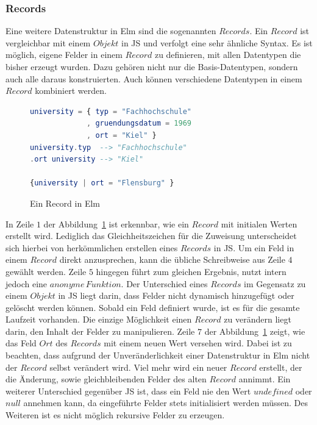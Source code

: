 \subsubsection{Records}
\label{sec:Records}
Eine weitere Datenstruktur in Elm sind die sogenannten $Records$. Ein $Record$ ist vergleichbar mit einem $Objekt$ in \ac{JS} und verfolgt eine sehr ähnliche Syntax. Es ist möglich, eigene Felder in einem $Record$ zu definieren, mit allen Datentypen die bisher erzeugt wurden. Dazu gehören nicht nur die Basis-Datentypen, sondern auch alle daraus konstruierten. Auch können verschiedene Datentypen in einem $Record$ kombiniert werden.
\begin{figure}[h]
\begin{lstlisting}[language=Elm]
university = { typ = "Fachhochschule"
             , gruendungsdatum = 1969
             , ort = "Kiel" }
university.typ  --> "Fachhochschule"
.ort university --> "Kiel"

{university | ort = "Flensburg" }
\end{lstlisting}
\caption{Ein Record in Elm}\label{fig:elm-record}
\end{figure}
In Zeile $1$ der Abbildung~\ref{fig:elm-record} ist erkennbar, wie ein $Record$ mit initialen Werten erstellt wird. Lediglich das Gleichheitszeichen für die Zuweisung unterscheidet sich hierbei von herkömmlichen erstellen eines $Records$ in \ac{JS}. Um ein Feld in einem $Record$ direkt anzusprechen, kann die übliche Schreibweise aus Zeile $4$ gewählt werden. Zeile $5$ hingegen führt zum gleichen Ergebnis, nutzt intern jedoch eine $anonyme\,Funktion$. Der Unterschied eines $Records$ im Gegensatz zu einem $Objekt$ in \ac{JS} liegt darin, dass Felder nicht dynamisch hinzugefügt oder gelöscht werden können. Sobald ein Feld definiert wurde, ist es für die gesamte Laufzeit vorhanden. Die einzige Möglichkeit einen $Record$ zu verändern liegt darin, den Inhalt der Felder zu manipulieren. Zeile $7$ der Abbildung~\ref{fig:elm-record} zeigt, wie das Feld $Ort$ des $Records$ mit einem neuen Wert versehen wird. Dabei ist zu beachten, dass aufgrund der Unveränderlichkeit einer Datenstruktur in Elm nicht der $Record$ selbst verändert wird. Viel mehr wird ein neuer $Record$ erstellt, der die Änderung, sowie gleichbleibenden Felder des alten $Record$ annimmt. Ein weiterer Unterschied gegenüber \ac{JS} ist, dass ein Feld nie den Wert $undefined$ oder $null$ annehmen kann, da eingeführte Felder stets initialisiert werden müssen. Des Weiteren ist es nicht möglich rekursive Felder zu erzeugen.

